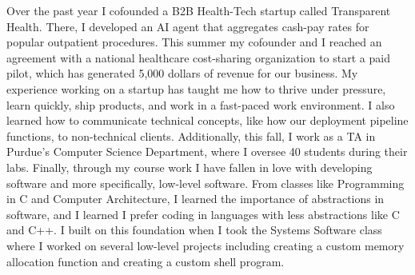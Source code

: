 


Over the past year I cofounded a B2B Health-Tech startup called Transparent Health. There, I developed an AI agent that aggregates cash-pay rates for popular outpatient procedures. This summer my cofounder and I reached an agreement with a national healthcare cost-sharing organization to start a paid pilot, which has generated 5,000 dollars of revenue for our business. My experience working on a startup has taught me how to thrive under pressure, learn quickly, ship products, and work in a fast-paced work environment. I also learned how to communicate technical concepts, like how our deployment pipeline functions, to non-technical clients. Additionally, this fall, I work as a TA in Purdue's Computer Science Department, where I oversee 40 students during their labs. Finally, through my course work I have fallen in love with developing software and more specifically, low-level software. From classes like Programming in C and Computer Architecture, I learned the importance of abstractions in software, and I learned I prefer coding in languages with less abstractions like C and C++. I built on this foundation when I took the Systems Software class where I worked on several low-level projects including creating a custom memory allocation function and creating a custom shell program.
